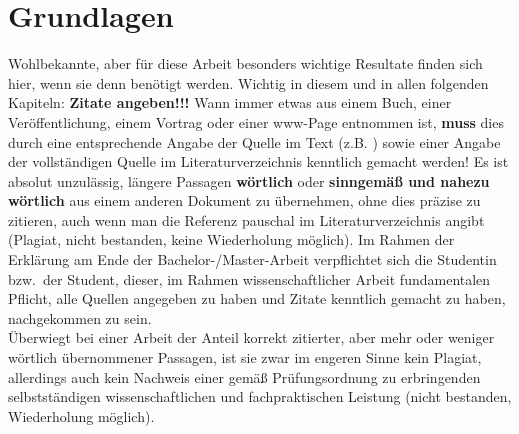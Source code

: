 \section{Grundlagen}
Wohlbekannte, aber für diese Arbeit besonders wichtige Resultate finden
sich hier, wenn sie denn benötigt werden. Wichtig in diesem und in allen
folgenden Kapiteln: {\bf Zitate angeben!!!} Wann immer etwas aus einem Buch,
einer Veröffentlichung, einem Vortrag oder einer www-Page entnommen ist, 
{\bf muss} dies durch eine entsprechende Angabe der Quelle im Text (z.B.
\cite[vgl.][S.\ 23ff]{Lenze_Einfuehrung_2000}) sowie einer Angabe der vollständigen Quelle im
Literaturverzeichnis kenntlich gemacht werden! Es ist absolut unzulässig,
längere Passagen {\bf wörtlich} oder {\bf sinngemäß und nahezu wörtlich} aus
einem anderen Dokument zu übernehmen, ohne dies präzise zu zitieren,
auch wenn man die Referenz pauschal im Literaturverzeichnis angibt
(Plagiat, nicht bestanden, keine Wiederholung möglich). Im Rahmen der 
Erklärung am Ende der Bachelor-/Master-Arbeit verpflichtet sich die
Studentin bzw.\ der 
Student, dieser, im Rahmen wissenschaftlicher Arbeit fundamentalen Pflicht,
alle Quellen angegeben zu haben und Zitate kenntlich gemacht zu haben,
nachgekommen zu sein. \\
Überwiegt bei einer Arbeit der Anteil korrekt
zitierter, aber mehr oder weniger wörtlich übernommener Passagen, ist sie zwar
im engeren Sinne kein Plagiat, allerdings auch kein Nachweis einer gemäß
Prüfungsordnung zu 
erbringenden selbstständigen wissenschaftlichen und fachpraktischen Leistung
(nicht bestanden, Wiederholung möglich). 